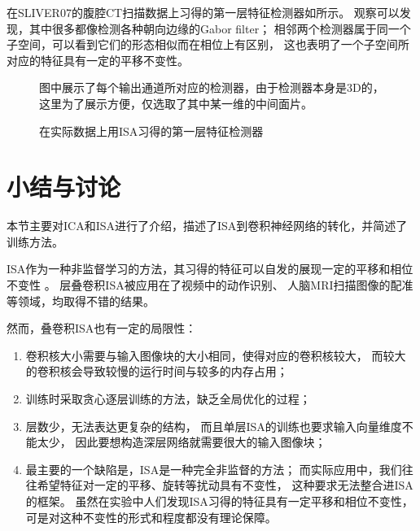 在SLIVER07的腹腔CT扫描数据上习得的第一层特征检测器如所示。
观察可以发现，其中很多都像检测各种朝向边缘的Gabor filter；
相邻两个检测器属于同一个子空间，可以看到它们的形态相似而在相位上有区别，
这也表明了一个子空间所对应的特征具有一定的平移不变性。

\begin{figure}[H]
    {
        \caption{在实际数据上用ISA习得的第一层特征检测器}
        \label{fig:isa:filter}
    }
    \footnotesize
    图中展示了每个输出通道所对应的检测器，由于检测器本身是3D的，
    这里为了展示方便，仅选取了其中某一维的中间面片。
\end{figure}


\section{小结与讨论\label{sec:ISA:discuss}}
本节主要对ICA和ISA进行了介绍，描述了ISA到卷积神经网络的转化，并简述了训练方法。

ISA作为一种非监督学习的方法，其习得的特征可以自发的展现一定的平移和相位不变性
\cite{hyvarinen2000emergence}。
层叠卷积ISA被应用在了视频中的动作识别\cite{le2011learning}、
人脑MRI扫描图像的配准\cite{wu2013unsupervised}等领域，均取得不错的结果。

然而，叠卷积ISA也有一定的局限性：
\begin{enumerate}
    \item 卷积核大小需要与输入图像块的大小相同，使得对应的卷积核较大，
        而较大的卷积核会导致较慢的运行时间与较多的内存占用；
    \item 训练时采取贪心逐层训练的方法，缺乏全局优化的过程；
    \item 层数少，无法表达更复杂的结构，
        而且单层ISA的训练也要求输入向量维度不能太少，
        因此要想构造深层网络就需要很大的输入图像块；
    \item 最主要的一个缺陷是，ISA是一种完全非监督的方法；
        而实际应用中，我们往往希望特征对一定的平移、旋转等扰动具有不变性，
        这种要求无法整合进ISA的框架。
        虽然在实验中人们发现ISA习得的特征具有一定平移和相位不变性，
        可是对这种不变性的形式和程度都没有理论保障。
\end{enumerate}


